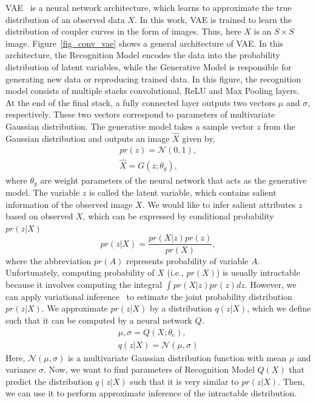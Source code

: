 VAE~\cite{Kingma2014AutoEncodingVB} is a neural network architecture, which learns to approximate the true distribution of an observed data $X$.
In this work, VAE is trained to learn the distribution of coupler curves in the form of images. Thus, here $X$ is an $S\times S$ image.
Figure~\ref{fig_conv_vae} shows a general architecture of VAE.
In this architecture, the Recognition Model encodes the data into the probability distribution of latent variables, while the Generative Model is responsible for generating new data or reproducing trained data.
In this figure, the recognition model consists of multiple stacks convolutional, ReLU and Max Pooling layers. At the end of the final stack, a fully connected layer outputs two vectors $\mu$ and $\sigma$, respectively. These two vectors correspond to parameters of multivariate Gaussian distribution.
The generative model takes a sample vector $z$ from the Gaussian distribution and outputs an image $\hat{X}$ given by,
\begin{eqnarray}
pr(z) = \mathcal{N}(0, 1)\label{pz},\\
  \hat{X} = G(z; \theta_g)\label{eq_G},
\end{eqnarray}
where $\theta_g$ are weight parameters of the neural network that acts as the generative model.
The variable $z$ is called the latent variable, which contains salient information of the observed image $X$.
We would like to infer salient attributes $z$ based on observed $X$, which can be expressed by conditional probability $pr(z|X)$
\begin{equation}
pr(z|X) = \frac{pr(X|z)pr(z)}{pr(X)},
\end{equation}
where the abbreviation $pr(A)$ represents probability of variable $A$.
Unfortunately, computing probability of $X$ (i.e., $pr(X)$) is usually intractable because it involves computing the integral $\int
pr(X|z)pr(z)dz.$
However, we can apply variational inference~\cite{blei2017variational} to estimate the joint probability distribution $pr(z|X)$.
We approximate $pr(z|X)$ by a distribution $q(z|X)$, which we define such that it can be computed by a neural network $Q$.
\begin{eqnarray}\label{eq_Q}
\mu, \sigma = Q(X; \theta_e),\\
  q(z|X) = \mathcal{N}(\mu, \sigma)
\end{eqnarray}
Here, $\mathcal{N}(\mu, \sigma)$ is a multivariate Gaussian distribution function with mean $\mu$ and variance $\sigma$.
Now, we want to find parameters of Recognition Model $Q(X)$ that predict the distribution $q(z|X)$ such that it is very similar to $pr(z|X)$. Then, we can use it to perform approximate inference of the intractable distribution.

